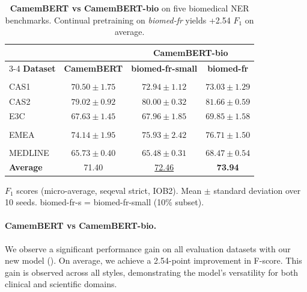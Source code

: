 \begin{table}[t]
\centering
\small
\setlength{\tabcolsep}{5pt}
\begin{threeparttable}[b]
\begin{tabular}{l c c c}
\toprule
& & \multicolumn{2}{c}{\textbf{CamemBERT-bio}} \\
\cmidrule(lr){3-4}
\textbf{Dataset} & \textbf{CamemBERT} & \textbf{biomed-fr-small} & \textbf{biomed-fr} \\
\midrule
\rowcolor{ThesisTableSep}
\multicolumn{4}{c}{\rule{0pt}{10pt}\textbf{Clinical}} \\[1pt]
CAS1 & $70.50 \pm 1.75$ & \underline{$72.94 \pm 1.12$} & $\mathbf{73.03 \pm 1.29}$ \\
CAS2 & $79.02 \pm 0.92$ & \underline{$80.00 \pm 0.32$} & $\mathbf{81.66 \pm 0.59}$ \\
E3C  & $67.63 \pm 1.45$ & \underline{$67.96 \pm 1.85$} & $\mathbf{69.85 \pm 1.58}$ \\
\midrule
\rowcolor{ThesisTableSep}
\multicolumn{4}{c}{\rule{0pt}{10pt}\textbf{Leaflets}} \\[1pt]
EMEA & $74.14 \pm 1.95$ & \underline{$75.93 \pm 2.42$} & $\mathbf{76.71 \pm 1.50}$ \\
\midrule
\rowcolor{ThesisTableSep}
\multicolumn{4}{c}{\rule{0pt}{10pt}\textbf{Scientific}} \\[1pt]
MEDLINE & \underline{$65.73 \pm 0.40$} & $65.48 \pm 0.31$ & $\mathbf{68.47 \pm 0.54}$ \\
\midrule
\textbf{Average} & 71.40 & \underline{72.46} & \bfseries 73.94 \\
\bottomrule
\end{tabular}
\begin{tablenotes}
  \small
  \item $F_1$ scores (micro-average, seqeval strict, IOB2). Mean $\pm$ standard deviation over 10 seeds. biomed-fr-s = biomed-fr-small (10\% subset).
\end{tablenotes}
\end{threeparttable}
\caption{\textbf{CamemBERT vs CamemBERT-bio} on five biomedical NER benchmarks. Continual pretraining on \textit{biomed-fr} yields +2.54 $F_1$ on average.}
\label{tab:bioVSbase}
\end{table}

\paragraph{CamemBERT vs CamemBERT-bio.} We observe a significant performance gain on all evaluation datasets with our new model (). On average, we achieve a 2.54-point improvement in F-score. This gain is observed across all styles, demonstrating the model's versatility for both clinical and scientific domains.

